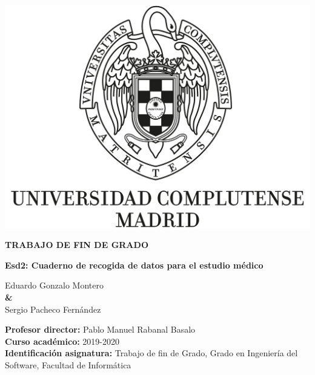 \documentclass{report}
\begin{document}
    \begin{titlepage}
        \centering
        {\includegraphics[width=1\textwidth]{images/logo_UCM}}
    
        \vspace{1cm}
        
        {\huge\textbf{TRABAJO DE FIN DE GRADO \\ }  }

        \vspace{0.5cm}
        
        {\huge\textbf{Esd2: Cuaderno de recogida de datos para el estudio médico}}
        
        \vspace{1.6cm}
    
        {\Large Eduardo Gonzalo Montero \\}
        \vspace{0.5cm}
        {\textbf \& \\}
        \vspace{0.5cm}
        {\Large Sergio Pacheco Fernández \\}
        
        \vspace{1.6cm}
        
        \raggedright
        {\Large \textbf{Profesor director:} Pablo Manuel Rabanal Basalo \\}
        \vspace{0.1cm}
        {\Large\textbf {Curso académico:} 2019-2020 \\}
        \vspace{0.1cm}
        {\Large\textbf {Identificación asignatura: }Trabajo de fin de Grado, Grado en Ingeniería del Software, Facultad de Informática \\}
   

\end{titlepage}
\end{document}

